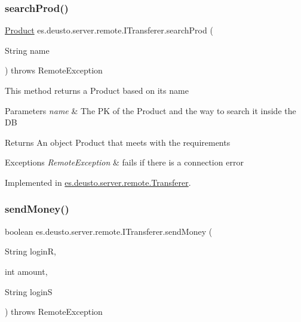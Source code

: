\subsubsection{\texorpdfstring{search\+Prod()}{searchProd()}}
{\footnotesize\ttfamily \hyperlink{classes_1_1deusto_1_1server_1_1db_1_1data_1_1_product}{Product} es.\+deusto.\+server.\+remote.\+I\+Transferer.\+search\+Prod (\begin{DoxyParamCaption}\item[{String}]{name }\end{DoxyParamCaption}) throws Remote\+Exception}

This method returns a Product based on its name 
\begin{DoxyParams}{Parameters}
{\em name} & The PK of the Product and the way to search it inside the DB \\
\hline
\end{DoxyParams}
\begin{DoxyReturn}{Returns}
An object Product that meets with the requirements 
\end{DoxyReturn}

\begin{DoxyExceptions}{Exceptions}
{\em Remote\+Exception} & fails if there is a connection error \\
\hline
\end{DoxyExceptions}


Implemented in \hyperlink{classes_1_1deusto_1_1server_1_1remote_1_1_transferer_ad6759f696eddd682b750f92ec41d1fcb}{es.\+deusto.\+server.\+remote.\+Transferer}.

\mbox{\label{interfacees_1_1deusto_1_1server_1_1remote_1_1_i_transferer_ab43399cfce0d84f6e27032a7c14865f6}} 
\subsubsection{\texorpdfstring{send\+Money()}{sendMoney()}}
{\footnotesize\ttfamily boolean es.\+deusto.\+server.\+remote.\+I\+Transferer.\+send\+Money (\begin{DoxyParamCaption}\item[{String}]{loginR,  }\item[{int}]{amount,  }\item[{String}]{loginS }\end{DoxyParamCaption}) throws Remote\+Exception}

